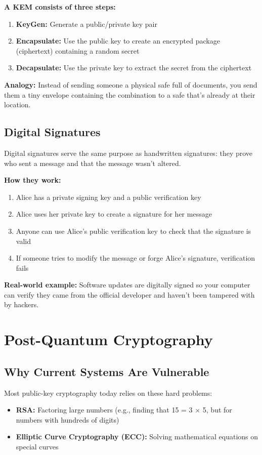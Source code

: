 \documentclass[12pt,a4paper]{report}
\begin{document}
\textbf{A KEM consists of three steps:}
\begin{enumerate}
\item \textbf{KeyGen:} Generate a public/private key pair
\item \textbf{Encapsulate:} Use the public key to create an encrypted package (ciphertext) containing a random secret
\item \textbf{Decapsulate:} Use the private key to extract the secret from the ciphertext
\end{enumerate}

\textbf{Analogy:} Instead of sending someone a physical safe full of documents, you send them a tiny envelope containing the combination to a safe that's already at their location.

\subsection{Digital Signatures}

Digital signatures serve the same purpose as handwritten signatures: they prove who sent a message and that the message wasn't altered.

\textbf{How they work:}
\begin{enumerate}
\item Alice has a private signing key and a public verification key
\item Alice uses her private key to create a signature for her message
\item Anyone can use Alice's public verification key to check that the signature is valid
\item If someone tries to modify the message or forge Alice's signature, verification fails
\end{enumerate}

\textbf{Real-world example:} Software updates are digitally signed so your computer can verify they came from the official developer and haven't been tampered with by hackers.

\section{Post-Quantum Cryptography}

\subsection{Why Current Systems Are Vulnerable}

Most public-key cryptography today relies on these hard problems:
\begin{itemize}
\item \textbf{RSA:} Factoring large numbers (e.g., finding that 15 = 3 × 5, but for numbers with hundreds of digits)
\item \textbf{Elliptic Curve Cryptography (ECC):} Solving mathematical equations on special curves
\end{itemize}
\end{document}
